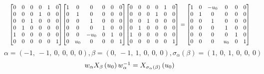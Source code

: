 \documentclass[11pt]{article}
\theoremstyle{definition}
\begin{document}
\[
\scaletoalign{\textwidth}{{\left[\begin{matrix}0 & 0 & 0 & 0 & 1 & 0\\0 & 0 & 0 & 1 & 0 & 0\\0 & 0 & 1 & 0 & 0 & 0\\0 & 1 & 0 & 0 & 0 & 0\\1 & 0 & 0 & 0 & 0 & 0\\0 & 0 & 0 & 0 & 0 & 1\end{matrix}\right]} {\left[\begin{matrix}1 & 0 & 0 & 0 & 0 & 0\\0 & 1 & 0 & 0 & 0 & 0\\0 & 0 & 1 & 0 & 0 & 0\\0 & 0 & 0 & 1 & 0 & 0\\0 & 0 & - u_{0} & 0 & 1 & 0\\0 & u_{0} & 0 & 0 & 0 & 1\end{matrix}\right]} {\left[\begin{matrix}0 & 0 & 0 & 0 & 1 & 0\\0 & 0 & 0 & 1 & 0 & 0\\0 & 0 & 1 & 0 & 0 & 0\\0 & 1 & 0 & 0 & 0 & 0\\1 & 0 & 0 & 0 & 0 & 0\\0 & 0 & 0 & 0 & 0 & 1\end{matrix}\right]} = {\left[\begin{matrix}1 & 0 & - u_{0} & 0 & 0 & 0\\0 & 1 & 0 & 0 & 0 & 0\\0 & 0 & 1 & 0 & 0 & 0\\0 & 0 & 0 & 1 & 0 & 0\\0 & 0 & 0 & 0 & 1 & 0\\0 & 0 & 0 & u_{0} & 0 & 1\end{matrix}\right]}}
\]
\[
\alpha = \left( -1, \  -1, \  0, \  0, \  0, \  0\right), \beta = \left( 0, \  -1, \  1, \  0, \  0, \  0\right), \sigma_{\alpha}(\beta) = \left( 1, \  0, \  1, \  0, \  0, \  0\right)
\]
\[
\scaletoalign{\textwidth}{w_{\alpha} X_{\beta}\left(u_{0}\right) w_{\alpha}^{-1} = X_{\sigma_{\alpha}\left(\beta\right)}\left(u_{0}\right)}
\]
\end{document}
